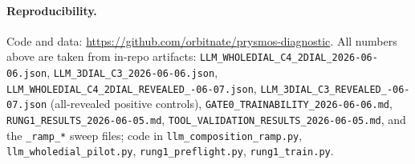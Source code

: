 \documentclass[11pt]{article}
\begin{document}
\paragraph{Reproducibility.} {\sloppy Code and data:
\url{https://github.com/orbitnate/prysmos-diagnostic}.
All numbers above are taken from in-repo artifacts:
\texttt{LLM\_WHOLEDIAL\_C4\_2DIAL\_2026-06-06.json}, \texttt{LLM\_3DIAL\_C3\_2026-06-06.json},
\texttt{LLM\_\allowbreak WHOLEDIAL\_\allowbreak C4\_\allowbreak 2DIAL\_\allowbreak REVEALED\_-06-07.json},
\texttt{LLM\_\allowbreak 3DIAL\_\allowbreak C3\_\allowbreak REVEALED\_-06-07.json} (all-revealed positive controls),
\texttt{GATE0\_TRAINABILITY\_2026-06-06.md}, \texttt{RUNG1\_RESULTS\_2026-06-05.md},
\texttt{TOOL\_VALIDATION\_RESULTS\_2026-06-05.md}, and the \texttt{\_ramp\_*} sweep files; code in
\texttt{llm\_composition\_ramp.py}, \texttt{llm\_wholedial\_pilot.py}, \texttt{rung1\_preflight.py},
\texttt{rung1\_train.py}.\par}
\end{document}
